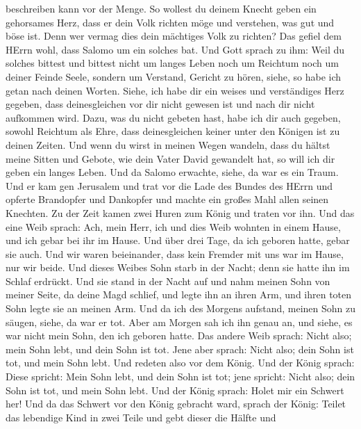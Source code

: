 beschreiben kann vor der Menge.  So wollest du deinem Knecht
geben ein gehorsames Herz, dass er dein Volk richten möge und verstehen,
was gut und böse ist. Denn wer vermag dies dein mächtiges Volk zu
richten?  Das gefiel dem HErrn wohl, dass Salomo um ein
solches bat.  Und Gott sprach zu ihm: Weil du solches
bittest und bittest nicht um langes Leben noch um Reichtum noch um
deiner Feinde Seele, sondern um Verstand, Gericht zu hören,
 siehe, so habe ich getan nach deinen Worten. Siehe, ich
habe dir ein weises und verständiges Herz gegeben, dass deinesgleichen
vor dir nicht gewesen ist und nach dir nicht aufkommen wird.
 Dazu, was du nicht gebeten hast, habe ich dir auch
gegeben, sowohl Reichtum als Ehre, dass deinesgleichen keiner unter den
Königen ist zu deinen Zeiten.  Und wenn du wirst in meinen
Wegen wandeln, dass du hältst meine Sitten und Gebote, wie dein Vater
David gewandelt hat, so will ich dir geben ein langes Leben.
 Und da Salomo erwachte, siehe, da war es ein Traum. Und er
kam gen Jerusalem und trat vor die Lade des Bundes des HErrn und opferte
Brandopfer und Dankopfer und machte ein großes Mahl allen seinen
Knechten.  Zu der Zeit kamen zwei Huren zum König und
traten vor ihn.  Und das eine Weib sprach: Ach, mein Herr,
ich und dies Weib wohnten in einem Hause, und ich gebar bei ihr im
Hause.  Und über drei Tage, da ich geboren hatte, gebar sie
auch. Und wir waren beieinander, dass kein Fremder mit uns war im Hause,
nur wir beide.  Und dieses Weibes Sohn starb in der Nacht;
denn sie hatte ihn im Schlaf erdrückt.  Und sie stand in
der Nacht auf und nahm meinen Sohn von meiner Seite, da deine Magd
schlief, und legte ihn an ihren Arm, und ihren toten Sohn legte sie an
meinen Arm.  Und da ich des Morgens aufstand, meinen Sohn
zu säugen, siehe, da war er tot. Aber am Morgen sah ich ihn genau an,
und siehe, es war nicht mein Sohn, den ich geboren hatte. 
Das andere Weib sprach: Nicht also; mein Sohn lebt, und dein Sohn ist
tot. Jene aber sprach: Nicht also; dein Sohn ist tot, und mein Sohn
lebt. Und redeten also vor dem König.  Und der König
sprach: Diese spricht: Mein Sohn lebt, und dein Sohn ist tot; jene
spricht: Nicht also; dein Sohn ist tot, und mein Sohn lebt.
 Und der König sprach: Holet mir ein Schwert her! Und da
das Schwert vor den König gebracht ward,  sprach der König:
Teilet das lebendige Kind in zwei Teile und gebt dieser die Hälfte und
